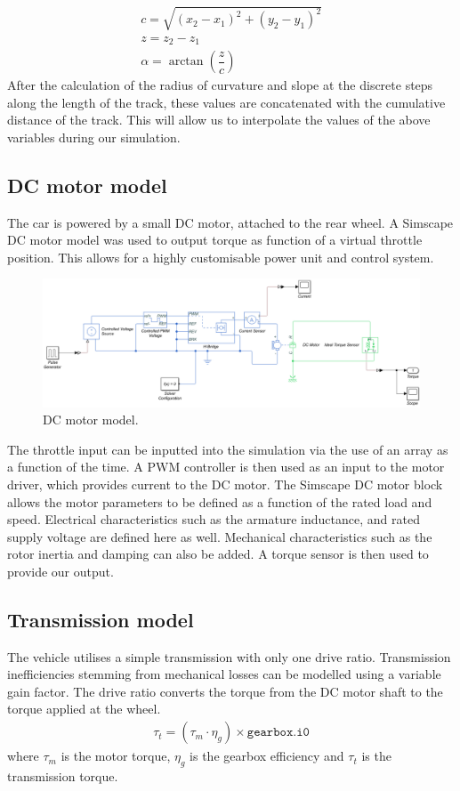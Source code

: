 \documentclass[11pt]{article}
\numberwithin{equation}{section}
\begin{document}
\begin{gather}
    c = \sqrt{\left(x_2 - x_1\right)^2 + \left(y_2 - y_1\right)^2}\\
    z = z_2 - z_1\\
    \alpha = \arctan\left(\dfrac{z}{c}\right)
\end{gather}
After the calculation of the radius of curvature and slope at the discrete steps along the length of the track, these values are concatenated with the cumulative distance of the track. This will allow us to interpolate the values of the above variables during our simulation. 
\subsection{DC motor model}
The car is powered by a small DC motor, attached to the rear wheel. A Simscape DC motor model was used to output torque as function of a virtual throttle position. This allows for a highly customisable power unit and control system.
\begin{figure}[H]
    \centering
    \includegraphics[width =\textwidth]{./img/DCMotorModel.png}
    \caption{DC motor model.}
\end{figure}
The throttle input can be inputted into the simulation via the use of an array as a function of the time. A PWM controller is then used as an input to the motor driver, which provides current to the DC motor. The Simscape DC motor block allows the motor parameters to be defined as a function of the rated load and speed. Electrical characteristics such as the armature inductance, and rated supply voltage are defined here as well. Mechanical characteristics such as the rotor inertia and damping can also be added. A torque sensor is then used to provide our output.
\subsection{Transmission model}
The vehicle utilises a simple transmission with only one drive ratio. Transmission inefficiencies stemming from mechanical losses can be modelled using a variable gain factor. The drive ratio converts the torque from the DC motor shaft to the torque applied at the wheel.
\begin{gather}
    \tau_{t} = \left( \tau_m \cdot \eta_{g} \right) \times \texttt{gearbox.i0}
\end{gather}
where $\tau_m$ is the motor torque, $\eta_{g}$ is the gearbox efficiency and $\tau_t$ is the transmission torque.
\end{document}
